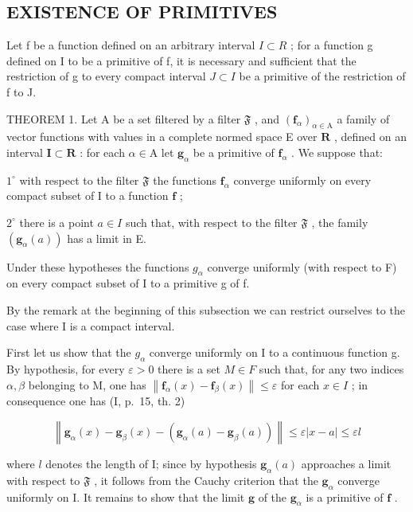 \subsection{EXISTENCE OF PRIMITIVES}

Let f be a function defined on an arbitrary interval \(I \subset R\) ; for a function g defined on I to be a primitive of f, it is necessary and sufficient that the restriction of g to every compact interval \(J \subset I\) be a primitive of the restriction of f to J.

THEOREM 1. Let A be a set filtered by a filter \(\mathfrak{F}\) , and \((\mathbf{f}_{\alpha})_{\alpha \in \mathrm{A}}\) a family of vector functions with values in a complete normed space E over \(\mathbf{R}\) , defined on an interval \(\mathbf{I} \subset \mathbf{R}\) : for each \(\alpha \in \mathrm{A}\) let \(\mathbf{g}_{\alpha}\) be a primitive of \(\mathbf{f}_{\alpha}\) . We suppose that:

\(1^{\circ}\) with respect to the filter \(\mathfrak{F}\) the functions \(\mathbf{f}_{\alpha}\) converge uniformly on every compact subset of I to a function \(\mathbf{f}\) ;

\(2^{\circ}\) there is a point \(a \in I\) such that, with respect to the filter \(\mathfrak{F}\) , the family \((\mathbf{g}_{\alpha}(a))\) has a limit in E.

Under these hypotheses the functions \(g_{\alpha}\) converge uniformly (with respect to F) on every compact subset of I to a primitive g of f.

By the remark at the beginning of this subsection we can restrict ourselves to the case where I is a compact interval.

First let us show that the \(g_{\alpha}\) converge uniformly on I to a continuous function g. By hypothesis, for every \(\varepsilon > 0\) there is a set \(M \in F\) such that, for any two indices \(\alpha, \beta\) belonging to M, one has \(\left\|\mathbf{f}_{\alpha}(x) - \mathbf{f}_{\beta}(x)\right\| \leqslant \varepsilon\) for each \(x \in I\) ; in consequence one has (I, p.~15, th. 2)

\[
\left\| \mathbf {g} _ {\alpha} (x) - \mathbf {g} _ {\beta} (x) - (\mathbf {g} _ {\alpha} (a) - \mathbf {g} _ {\beta} (a)) \right\| \leqslant \varepsilon | x - a | \leqslant \varepsilon l
\]

where \(l\) denotes the length of I; since by hypothesis \(\mathbf{g}_{\alpha}(a)\) approaches a limit with respect to \(\mathfrak{F}\) , it follows from the Cauchy criterion that the \(\mathbf{g}_{\alpha}\) converge uniformly on I. It remains to show that the limit \(\mathbf{g}\) of the \(\mathbf{g}_{\alpha}\) is a primitive of \(\mathbf{f}\) .

